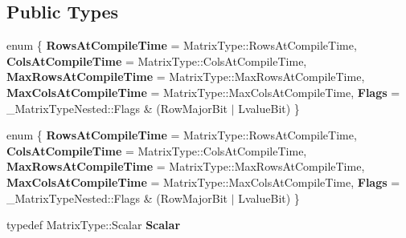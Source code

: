 \subsection*{Public Types}
\begin{DoxyCompactItemize}
\item 
\mbox{\label{struct_eigen_1_1internal_1_1traits_3_01_reverse_3_01_matrix_type_00_01_direction_01_4_01_4_ac6a68a2b442fe7f4b02c63f8eccddecb}} 
enum \{ \newline
{\bfseries Rows\+At\+Compile\+Time} = Matrix\+Type\+:\+:Rows\+At\+Compile\+Time, 
{\bfseries Cols\+At\+Compile\+Time} = Matrix\+Type\+:\+:Cols\+At\+Compile\+Time, 
{\bfseries Max\+Rows\+At\+Compile\+Time} = Matrix\+Type\+:\+:Max\+Rows\+At\+Compile\+Time, 
{\bfseries Max\+Cols\+At\+Compile\+Time} = Matrix\+Type\+:\+:Max\+Cols\+At\+Compile\+Time, 
\newline
{\bfseries Flags} = \+\_\+\+Matrix\+Type\+Nested\+:\+:Flags \& (Row\+Major\+Bit $\vert$ Lvalue\+Bit)
 \}
\item 
\mbox{\label{struct_eigen_1_1internal_1_1traits_3_01_reverse_3_01_matrix_type_00_01_direction_01_4_01_4_abb605c1f9a288e1bf7d3b8fbc12e4f90}} 
enum \{ \newline
{\bfseries Rows\+At\+Compile\+Time} = Matrix\+Type\+:\+:Rows\+At\+Compile\+Time, 
{\bfseries Cols\+At\+Compile\+Time} = Matrix\+Type\+:\+:Cols\+At\+Compile\+Time, 
{\bfseries Max\+Rows\+At\+Compile\+Time} = Matrix\+Type\+:\+:Max\+Rows\+At\+Compile\+Time, 
{\bfseries Max\+Cols\+At\+Compile\+Time} = Matrix\+Type\+:\+:Max\+Cols\+At\+Compile\+Time, 
\newline
{\bfseries Flags} = \+\_\+\+Matrix\+Type\+Nested\+:\+:Flags \& (Row\+Major\+Bit $\vert$ Lvalue\+Bit)
 \}
\item 
\mbox{\label{struct_eigen_1_1internal_1_1traits_3_01_reverse_3_01_matrix_type_00_01_direction_01_4_01_4_ac5be0e9568d9607bcb0a7c1730b3d012}} 
typedef Matrix\+Type\+::\+Scalar {\bfseries Scalar}
\item 
\mbox{\label{struct_eigen_1_1internal_1_1traits_3_01_reverse_3_01_matrix_type_00_01_direction_01_4_01_4_a1a9e576ce2d866a919ff6f333673fc14}} 

\end{DoxyCompactItemize}

